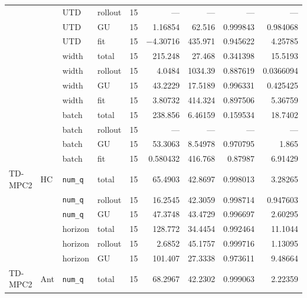 {\begin{longtable}{@{}llllrrrrr@{}}
     &  & UTD & rollout & \num{15} & --- & --- & --- & --- \\
     &  & UTD & GU & \num{15} & \num{1.16854} & \num{62.516} & \num{0.999843} & \num{0.984068} \\
     &  & UTD & fit & \num{15} & \num{-4.30716} & \num{435.971} & \num{0.945622} & \num{4.25785} \\
     &  & width & total & \num{15} & \num{215.248} & \num{27.468} & \num{0.341398} & \num{15.5193} \\
     &  & width & rollout & \num{15} & \num{4.0484} & \num{1034.39} & \num{0.887619} & \num{0.0366094} \\
     &  & width & GU & \num{15} & \num{43.2229} & \num{17.5189} & \num{0.996331} & \num{0.425425} \\
     &  & width & fit & \num{15} & \num{3.80732} & \num{414.324} & \num{0.897506} & \num{5.36759} \\
     &  & batch & total & \num{15} & \num{238.856} & \num{6.46159} & \num{0.159534} & \num{18.7402} \\
     &  & batch & rollout & \num{15} & --- & --- & --- & --- \\
     &  & batch & GU & \num{15} & \num{53.3063} & \num{8.54978} & \num{0.970795} & \num{1.865} \\
     &  & batch & fit & \num{15} & \num{0.580432} & \num{416.768} & \num{0.87987} & \num{6.91429} \\
    \midrule
    TD-MPC2 & HC & \texttt{num\_\allowbreak q} & total & \num{15} & \num{65.4903} & \num{42.8697} & \num{0.998013} & \num{3.28265} \\
     &  & \texttt{num\_\allowbreak q} & rollout & \num{15} & \num{16.2545} & \num{42.3059} & \num{0.998714} & \num{0.947603} \\
     &  & \texttt{num\_\allowbreak q} & GU & \num{15} & \num{47.3748} & \num{43.4729} & \num{0.996697} & \num{2.60295} \\
     &  & horizon & total & \num{15} & \num{128.772} & \num{34.4454} & \num{0.992464} & \num{11.1044} \\
     &  & horizon & rollout & \num{15} & \num{2.6852} & \num{45.1757} & \num{0.999716} & \num{1.13095} \\
     &  & horizon & GU & \num{15} & \num{101.407} & \num{27.3338} & \num{0.973611} & \num{9.48664} \\
    TD-MPC2 & Ant & \texttt{num\_\allowbreak q} & total & \num{15} & \num{68.2967} & \num{42.2302} & \num{0.999063} & \num{2.22359} \\

\end{longtable}}
